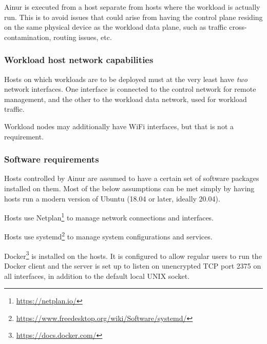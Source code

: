 Ainur is executed from a host separate from hosts where the workload is actually run.
This is to avoid issues that could arise from having the control plane residing on the same physical device as the workload data plane, such as traffic cross-contamination, routing issues, etc.

\subsubsection{Workload host network capabilities}

Hosts on which workloads are to be deployed must at the very least have \emph{two} network interfaces. 
One interface is connected to the control network for remote management, and the other to the workload data network, used for workload traffic.

Workload nodes may additionally have WiFi interfaces, but that is not a requirement.

\subsubsection{Software requirements}

Hosts controlled by Ainur are assumed to have a certain set of software packages installed on them.
Most of the below assumptions can be met simply by having hosts run a modern version of Ubuntu (18.04 or later, ideally 20.04).

\begin{description}[style=unboxed]


    \item[Netplan]
    
    Hosts use Netplan\footnote{\url{https://netplan.io/}} to manage network connections and interfaces.
    
    \item[systemd]
    
    Hosts use systemd\footnote{\url{https://www.freedesktop.org/wiki/Software/systemd/}} to manage system configurations and services.
    
    \item[Docker]
    
    Docker\footnote{\url{https://docs.docker.com/}} is installed on the hosts.
    It is configured to allow regular users to run the Docker client and the server is set up to listen on unencrypted \ac{TCP} port \num{2375} on all interfaces, in addition to the default local UNIX socket.
\end{description}

